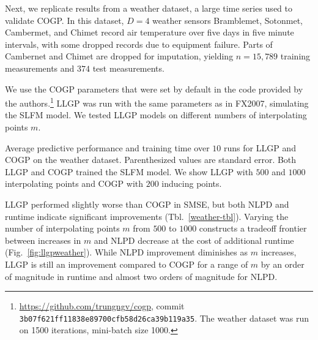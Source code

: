 \documentclass{article}
\begin{document}
Next, we replicate results from a weather dataset, a large time series used to validate COGP. In this dataset, $D=4$ weather sensors Bramblemet, Sotonmet, Cambermet, and Chimet record air temperature over five days in five minute intervals, with some dropped records due to equipment failure. Parts of Cambernet and Chimet are dropped for imputation, yielding $n=15,789$ training measurements and $374$ test measurements. 

We use the COGP parameters that were set by default in the code provided by the authors.\footnote{\url{https://github.com/trungngv/cogp}, commit \texttt{3b07f621ff11838e89700cfb58d26ca39b119a35}. The weather dataset was run on 1500 iterations, mini-batch size 1000.} LLGP was run with the same parameters as in FX2007, simulating the SLFM model. We tested LLGP models on different numbers of interpolating points $m$.

\begin{table}[!ht]
  \caption{Average predictive performance and training time over $10$ runs for LLGP and COGP on the weather dataset. Parenthesized values are standard error. Both LLGP and COGP trained the SLFM model. We show LLGP with $500$ and $1000$ interpolating points and COGP with $200$ inducing points.}
\label{weather-tbl}
\vskip 0.15in
\begin{center}
  \begin{small}
    \begin{sc}
      
\end{sc}
\end{small}
\end{center}
\vskip -0.1in
\end{table}

LLGP performed slightly worse than COGP in SMSE, but both NLPD and runtime indicate significant improvements (Tbl.~\ref{weather-tbl}). Varying the number of interpolating points $m$ from $500$ to $1000$ constructs a tradeoff frontier between increases in $m$ and NLPD decrease at the cost of additional runtime (Fig.~\ref{fig:llgpweather}). While NLPD improvement diminishes as $m$ increases, LLGP is still an improvement compared to COGP for a range of $m$ by an order of magnitude in runtime and almost two orders of magnitude for NLPD.
\end{document}

